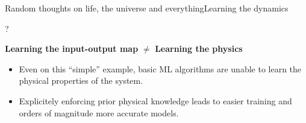 \begin{frame}[t, c]{Random thoughts on life, the universe and everything}{Learning the dynamics}
  
  \begin{minipage}{.28\textwidth}
    \centering
    \Huge ?
  \end{minipage}%
  \hfill
  \begin{minipage}{.68\textwidth}
    \centering
    \begin{block}{}
      \centering
      \textbf{Learning the input-output map} \( \neq \) \textbf{Learning the physics}
    \end{block}
    
    \medskip
    
    \begin{itemize}
    \item Even on this ``simple'' example, basic ML algorithms are unable to learn the physical properties of the system.
      
      \medskip
      
    \item Explicitely enforcing prior physical knowledge leads to easier training and orders of magnitude more accurate models.
    \end{itemize}
  \end{minipage}
  
  \vspace{1cm}
\end{frame}

